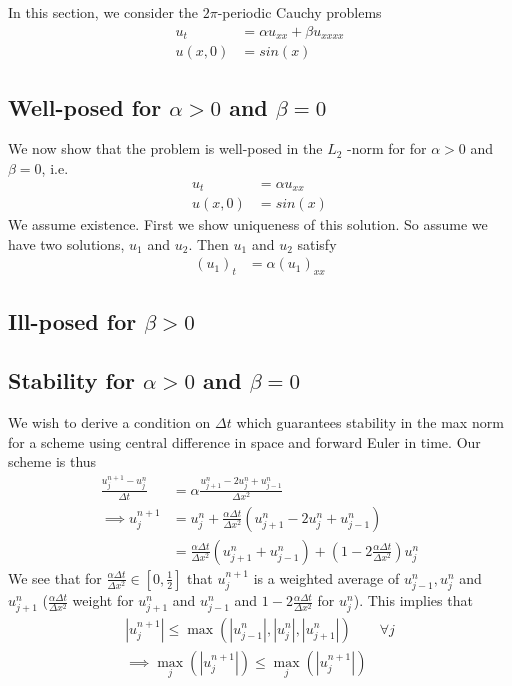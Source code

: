 In this section, we consider the $2\pi$-periodic Cauchy problems
\begin{align*}
u_t &= \alpha u_{xx} + \beta u_{xxxx} \\
u(x,0) &= sin(x)
\end{align*}


\subsection{Well-posed for $\alpha>0$ and $\beta = 0$}
We now show that the problem is well-posed in the $L_2$ -norm for for $\alpha>0$ and $\beta = 0$, i.e.
\begin{align*}
u_t &= \alpha u_{xx} \\
u(x,0) &= sin(x)
\end{align*} 
We assume existence. First we show uniqueness of this solution. So assume we have two solutions, $u_1$ and $u_2$. Then $u_1$ and $u_2$ satisfy
\begin{align*}
(u_1)_t &= \alpha (u_1)_{xx} 
\end{align*}


\subsection{Ill-posed for $\beta>0$}


\subsection{Stability for $\alpha>0$ and $\beta=0$}
We wish to derive a condition on $\Delta t$ which guarantees stability in the max norm for a scheme using central difference in space and forward Euler in time. Our scheme is thus
\begin{align*}
\frac{u_j^{n+1} - u_j^n}{\Delta t}&=\alpha \frac{u_{j+1}^n -2u_j^n+u_{j-1}^n}{\Delta x^2} \\
\implies u_j^{n+1} &= u_j^n + \frac{\alpha \Delta t}{\Delta x^2} (u_{j+1}^n -2u_j^n+u_{j-1}^n) \\
&=  \frac{\alpha \Delta t}{\Delta x^2} (u_{j+1}^n +u_{j-1}^n) + (1-2\frac{\alpha \Delta t}{\Delta x^2})u_j^n 
\end{align*}
We see that for $\frac{\alpha \Delta t}{\Delta x^2} \in [0,\frac{1}{2}]$ that $u_j^{n+1}$ is a weighted average of $u_{j-1}^n,u_j^n$ and $u_{j+1}^n$ ($\frac{\alpha \Delta t}{\Delta x^2}$ weight for $u_{j+1}^n$ and $u_{j-1}^n$ and $1-2\frac{\alpha \Delta t}{\Delta x^2}$ for $u_j^n$).
This implies that
\begin{align}
|u_j^{n+1}| \leq \max(|u_{j-1}^n|,|u_j^n|,|u_{j+1}^n|) \qquad \forall j \label{maxeq} \\
\implies \max_j (|u_j^{n+1}|) \leq \max_j (|u_j^{n+1}|) \nonumber
\end{align}

